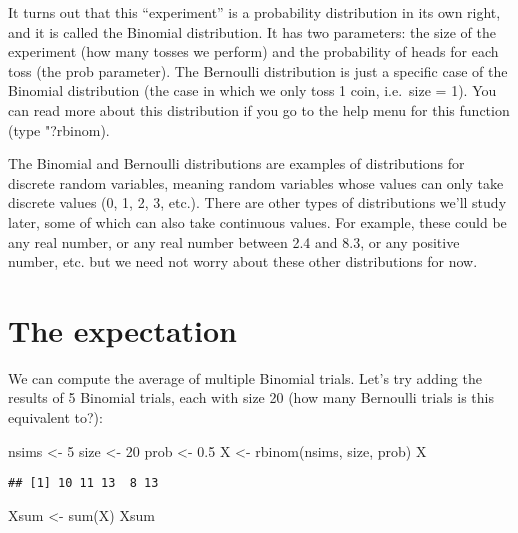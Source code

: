 \documentclass[
]{book}
\newenvironment{Shaded}{\begin{snugshade}}{\end{snugshade}}
\newcommand{\DecValTok}[1]{\textcolor[rgb]{0.00,0.00,0.81}{#1}}
\newcommand{\FloatTok}[1]{\textcolor[rgb]{0.00,0.00,0.81}{#1}}
\newcommand{\FunctionTok}[1]{\textcolor[rgb]{0.00,0.00,0.00}{#1}}
\newcommand{\NormalTok}[1]{#1}
\newcommand{\OtherTok}[1]{\textcolor[rgb]{0.56,0.35,0.01}{#1}}
\begin{document}
It turns out that this ``experiment'' is a probability distribution in its own right, and it is called the Binomial distribution. It has two parameters: the size of the experiment (how many tosses we perform) and the probability of heads for each toss (the prob parameter). The Bernoulli distribution is just a specific case of the Binomial distribution (the case in which we only toss 1 coin, i.e.~size = 1). You can read more about this distribution if you go to the help menu for this function (type "?rbinom).

The Binomial and Bernoulli distributions are examples of distributions for discrete random variables, meaning random variables whose values can only take discrete values (0, 1, 2, 3, etc.). There are other types of distributions we'll study later, some of which can also take continuous values. For example, these could be any real number, or any real number between 2.4 and 8.3, or any positive number, etc. but we need not worry about these other distributions for now.

\hypertarget{the-expectation}{%
\section{The expectation}\label{the-expectation}}

We can compute the average of multiple Binomial trials. Let's try adding the results of 5 Binomial trials, each with size 20 (how many Bernoulli trials is this equivalent to?):

\begin{Shaded}
\begin{Highlighting}[]
\NormalTok{nsims }\OtherTok{\textless{}{-}} \DecValTok{5}
\NormalTok{size }\OtherTok{\textless{}{-}} \DecValTok{20}
\NormalTok{prob }\OtherTok{\textless{}{-}} \FloatTok{0.5}
\NormalTok{X }\OtherTok{\textless{}{-}} \FunctionTok{rbinom}\NormalTok{(nsims, size, prob)}
\NormalTok{X}
\end{Highlighting}
\end{Shaded}

\begin{verbatim}
## [1] 10 11 13  8 13
\end{verbatim}

\begin{Shaded}
\begin{Highlighting}[]
\NormalTok{Xsum }\OtherTok{\textless{}{-}} \FunctionTok{sum}\NormalTok{(X)}
\NormalTok{Xsum}
\end{Highlighting}
\end{Shaded}
\end{document}
